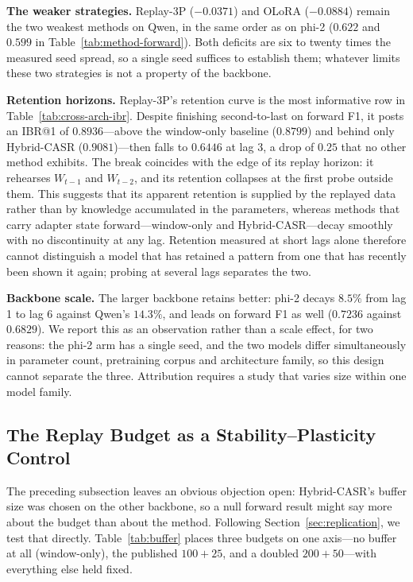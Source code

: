 \documentclass[a4paper,twoside]{article}
\begin{document}
\textbf{The weaker strategies.} Replay-3P ($-0.0371$) and OLoRA ($-0.0884$) remain the two weakest methods on Qwen, in the same order as on phi-2 ($0.622$ and $0.599$ in Table~\ref{tab:method-forward}). Both deficits are six to twenty times the measured seed spread, so a single seed suffices to establish them; whatever limits these two strategies is not a property of the backbone.

\textbf{Retention horizons.} Replay-3P's retention curve is the most informative row in Table~\ref{tab:cross-arch-ibr}. Despite finishing second-to-last on forward F1, it posts an IBR@1 of $0.8936$---above the window-only baseline ($0.8799$) and behind only Hybrid-CASR ($0.9081$)---then falls to $0.6446$ at lag 3, a drop of $0.25$ that no other method exhibits. The break coincides with the edge of its replay horizon: it rehearses $W_{t-1}$ and $W_{t-2}$, and its retention collapses at the first probe outside them. This suggests that its apparent retention is supplied by the replayed data rather than by knowledge accumulated in the parameters, whereas methods that carry adapter state forward---window-only and Hybrid-CASR---decay smoothly with no discontinuity at any lag. Retention measured at short lags alone therefore cannot distinguish a model that has retained a pattern from one that has recently been shown it again; probing at several lags separates the two.

\textbf{Backbone scale.} The larger backbone retains better: phi-2 decays $8.5\%$ from lag 1 to lag 6 against Qwen's $14.3\%$, and leads on forward F1 as well ($0.7236$ against $0.6829$). We report this as an observation rather than a scale effect, for two reasons: the phi-2 arm has a single seed, and the two models differ simultaneously in parameter count, pretraining corpus and architecture family, so this design cannot separate the three. Attribution requires a study that varies size within one model family.

\subsection{The Replay Budget as a Stability--Plasticity Control}
\label{sec:buffer}

\noindent
The preceding subsection leaves an obvious objection open: Hybrid-CASR's buffer size was chosen on the other backbone, so a null forward result might say more about the budget than about the method. Following Section~\ref{sec:replication}, we test that directly. Table~\ref{tab:buffer} places three budgets on one axis---no buffer at all (window-only), the published $100{+}25$, and a doubled $200{+}50$---with everything else held fixed.
\end{document}
